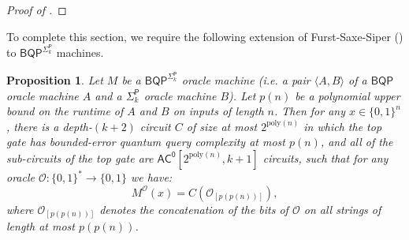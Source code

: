 \documentclass[10pt,a4paper]{article}
\newtheorem{proposition}[theorem]{Proposition}
\newcommand{\poly}{\mathrm{poly}}
\newcommand{\Sipser}{\normalfont\textsc{Sipser}}
\begin{document}
\begin{proof}[Proof of ]
%
\end{proof}

To complete this section, we require the following extension of Furst-Saxe-Siper \cite{FSS84} () to $\mathsf{BQP}^{\mathsf{\Sigma}_k^\mathsf{P}}$ machines.

\begin{proposition}
\label{prop:fss_bqp^ph}
Let $M$ be a $\mathsf{BQP}^{\mathsf{\Sigma}_k^\mathsf{P}}$ oracle machine (i.e. a pair $\langle A, B \rangle$ of a $\mathsf{BQP}$ oracle machine $A$ and a $\mathsf{\Sigma}_k^\mathsf{P}$ oracle machine $B$). Let $p(n)$ be a polynomial upper bound on the runtime of $A$ and $B$ on inputs of length $n$. Then for any $x \in \{0,1\}^n$, there is a depth-$(k+2)$ circuit $C$ of size at most $2^{\poly(n)}$ in which the top gate has bounded-error quantum query complexity at most $p(n)$, and all of the sub-circuits of the top gate are $\mathsf{AC^0}\left[2^{\poly(n)}, k+1\right]$ circuits, such that for any oracle $\mathcal{O}: \{0,1\}^* \to \{0,1\}$ we have:
\[
M^\mathcal{O}(x) = C\left( \mathcal{O}_{[p(p(n))]} \right),
\]
where $\mathcal{O}_{[p(p(n))]}$ denotes the concatenation of the bits of $\mathcal{O}$ on all strings of length at most $p(p(n))$.
\end{proposition}
\end{document}
